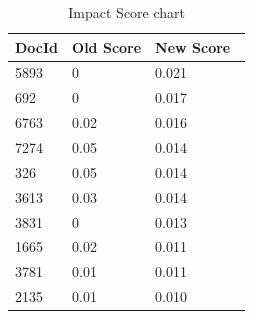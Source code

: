 \documentclass{article}
\begin{document}
\begin{table}[ht]
\caption{Impact Score chart} %
\centering %
\begin{tabular}{|p{3cm}|p{3cm}|p{3cm}| } %
\hline\hline %
DocId & Old Score & New Score\ \\ [0.5ex] %
\hline %
5893 & 0
  & 0.021 \\ %
  692 & 0
  & 0.017 \\ %
  6763 & 0.02
  & 0.016 \\ %
  7274 & 0.05
  & 0.014 \\ %
  326 & 0.05
  & 0.014 \\ %
    3613 & 0.03
  & 0.014 \\ %
    3831 & 0
  & 0.013 \\ %
    1665 & 0.02
  & 0.011 \\ %
    3781 & 0.01
  & 0.011 \\ %
    2135 & 0.01
  & 0.010 \\  [1ex] %
\hline %
\end{tabular}
\label{table:nonlin} %
\end{table}
\end{document}
